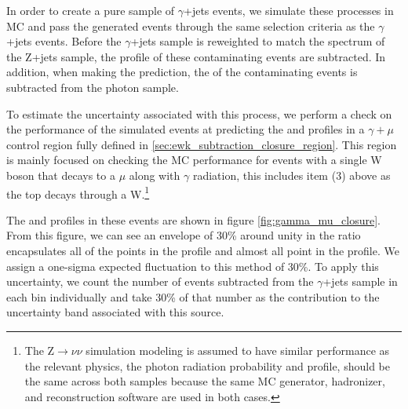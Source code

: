       In order to create a pure sample of $\gamma$+jets events, we simulate these processes in MC and pass the generated events through the same selection criteria as the $\gamma$+jets events. Before the $\gamma$+jets sample is reweighted to match the \pt spectrum of the Z+jets sample, the \pt profile of these contaminating events are subtracted. In addition, when making the \MET prediction, the \MET of the contaminating events is subtracted from the photon sample.

      To estimate the uncertainty associated with this process, we perform a check on the performance of the simulated events at predicting the \MET and \pt profiles in a $\gamma+\mu$ control region fully defined in \ref{sec:ewk_subtraction_closure_region}. This region is mainly focused on checking the MC performance for events with a single W boson that decays to a $\mu$ along with $\gamma$ radiation, this includes item (3) above as the top decays through a W.\footnote{The Z$\to\nu\nu$ simulation modeling is assumed to have similar performance as the relevant physics, the photon radiation probability and \pt profile, should be the same across both samples because the same MC generator, hadronizer, and reconstruction software are used in both cases.}

       The \MET and \pt profiles in these events are shown in figure \ref{fig:gamma_mu_closure}. From this figure, we can see an envelope of 30\% around unity in the ratio encapsulates all of the points in the \MET profile and almost all point in the \pt profile. We assign a one-sigma expected fluctuation to this method of 30\%. To apply this uncertainty, we count the number of events subtracted from the $\gamma$+jets sample in each \MET bin individually and take 30\% of that number as the contribution to the uncertainty band associated with this source.

